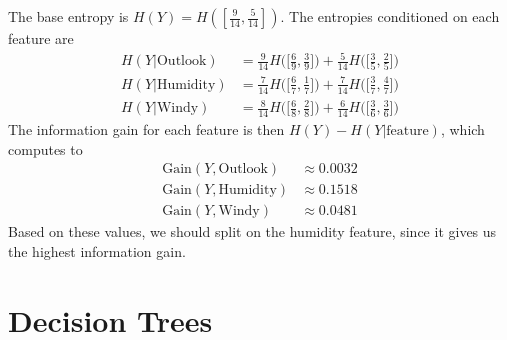 \documentclass{article}
\begin{document}
\begin{enumerate}
	The base entropy is $H(Y) = H([\frac{9}{14}, \frac{5}{14}])$. The entropies conditioned on each feature are
	\begin{align*}
		H(Y|\text{Outlook}) &= \frac{9}{14} H\Big(\Big[\frac{6}{9}, \frac{3}{9}\Big]\Big) + \frac{5}{14} H\Big(\Big[\frac{3}{5}, \frac{2}{5}\Big]\Big) \\
		H(Y|\text{Humidity}) &= \frac{7}{14} H\Big(\Big[\frac{6}{7}, \frac{1}{7}\Big]\Big) + \frac{7}{14} H\Big(\Big[\frac{3}{7}, \frac{4}{7}\Big]\Big) \\
		H(Y|\text{Windy}) &= \frac{8}{14} H\Big(\Big[\frac{6}{8}, \frac{2}{8}\Big]\Big) + \frac{6}{14} H\Big(\Big[\frac{3}{6}, \frac{3}{6}\Big]\Big)
	\end{align*}
	The information gain for each feature is then $H(Y) - H(Y|\text{feature})$, which computes to
	\begin{align*}
		\text{Gain}(Y, \text{Outlook}) &\approx 0.0032 \\
		\text{Gain}(Y, \text{Humidity}) &\approx 0.1518 \\
		\text{Gain}(Y, \text{Windy}) &\approx 0.0481
	\end{align*}
	Based on these values, we should split on the humidity feature, since it gives us the highest information gain.
\end{enumerate}

\section{Decision Trees}
\end{document}
